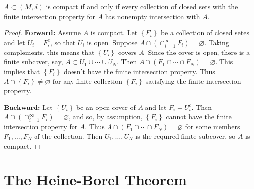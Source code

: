 \documentclass[10pt]{report}
\begin{document}
\begin{prop}
	$A \subset (M,d)$ is compact if and only if every collection of closed sets with the finite intersection property for $A$ has nonempty intersection with $A$.
\end{prop}
\begin{proof}
	\textbf{Forward:} Assume $A$ is compact. Let $\left\{ F_i \right\}$ be a collection of closed setes and let $U_i = F_i^c$, so that $U_i$ is open. Suppose $A \cap ( \cap_{i=1}^\infty F_i) = \varnothing$. Taking complements, this means that $\left\{ U_i \right\}$ covers $A$. Since the cover is open, there is a finite subcover, say, $A \subset U_1 \cup \cdots \cup U_N$. Then $A \cap (F_1 \cap \cdots \cap F_N) = \varnothing$. This implies that $\left\{ F_i \right\}$ doesn't have the finite intersection property. Thus $A \cap \left\{ F_i \right\} \neq \varnothing$ for any finite collection $\left\{ F_i \right\}$ satisfying the finite intersection property.

	\textbf{Backward:} Let $\left\{ U_i \right\}$ be an open cover of $A$ and let $F_i = U_i^c$. Then $A \cap (\cap_{i=1}^\infty F_i) = \varnothing$, and so, by assumption, $\left\{ F_i \right\}$ cannot have the finite intersection property for $A$. Thus $A \cap (F_1 \cap\cdots\cap F_N) = \varnothing$ for some members $F_1,\dots,F_N$ of the collection. Then $U_1,\dots,U_N$ is the required finite subcover, so $A$ is compact.
\end{proof}



\section{The Heine-Borel Theorem}
\end{document}
